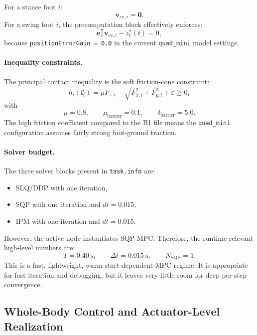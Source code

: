 \documentclass[11pt,a4paper]{article}
\newcommand{\vect}[1]{\boldsymbol{#1}}
\newcommand{\trans}{^{\mathsf T}}
\newcommand{\code}[1]{\texttt{#1}}
\begin{document}
For a stance foot $i$:
\begin{equation}
\vect{v}_{ee,i} = \vect{0}.
\end{equation}
For a swing foot $i$, the precomputation block effectively enforces:
\begin{equation}
\vect{e}_z\trans \vect{v}_{ee,i} - \dot{z}_i^{\star}(t) = 0,
\end{equation}
because \code{positionErrorGain = 0.0} in the current \code{quad\_mini} model settings.

\paragraph{Inequality constraints.}
The principal contact inequality is the soft friction-cone constraint:
\begin{equation}
h_i(\vect{f}_i) =
\mu F_{z,i} - \sqrt{F_{x,i}^2 + F_{y,i}^2 + \varepsilon} \ge 0,
\end{equation}
with
\begin{equation}
\mu = 0.8, \qquad
\mu_{\mathrm{barrier}} = 0.1, \qquad
\delta_{\mathrm{barrier}} = 5.0.
\end{equation}
The high friction coefficient compared to the B1 file means the \code{quad\_mini} configuration assumes fairly strong foot-ground traction.

\paragraph{Solver budget.}
The three solver blocks present in \code{task.info} are:
\begin{itemize}[leftmargin=*]
  \item SLQ/DDP with one iteration,
  \item SQP with one iteration and $dt=0.015$,
  \item IPM with one iteration and $dt=0.015$.
\end{itemize}
However, the active node instantiates SQP-MPC. Therefore, the runtime-relevant high-level numbers are:
\begin{equation}
T = 0.40~\mathrm{s}, \qquad
\Delta t = 0.015~\mathrm{s}, \qquad
N_{\mathrm{SQP}} = 1.
\end{equation}
This is a fast, lightweight, warm-start-dependent MPC regime. It is appropriate for fast iteration and debugging, but it leaves very
little room for deep per-step convergence.

\subsection{Whole-Body Control and Actuator-Level Realization}
\end{document}

